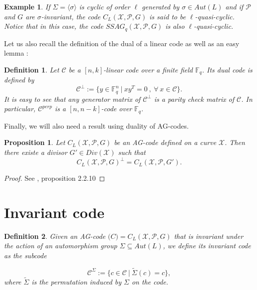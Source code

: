 \documentclass[10pt]{article}
\newtheorem{def1}{Definition}[]
\newtheorem{expl}{Example}[]
\newtheorem{prop1}{Proposition}[]
\newcommand{\s}{\vspace{0.3cm}}
\newcommand{\fq}{\mathbb{F}_q}
\newcommand{\su}{\subseteq}
\newcommand{\X}{\mathcal{X}}
\newcommand{\PR}{\mathcal{P}}
\begin{document}
\s

\begin{expl} 
\rm If $\Sigma = \langle\sigma\rangle$ is cyclic of order $\ell$ generated by $\sigma \in Aut(L)$ and if $\PR$ and $G$ are $\sigma$-invariant, the code $C_L(\X,\PR,G)$ is said to be $\ell$-quasi-cyclic. Notice that in this case, the code $SSAG_q(\X,\PR,G)$ is also $\ell$-quasi-cyclic.
\end{expl}

\s

Let us also recall the definition of the dual of a linear code as well as an easy lemma :

\s

\begin{def1}
Let $\mathcal{C}$ be a $[n,k]$-linear code over a finite field $\fq$. Its dual code is defined by 
\[\mathcal{C}^{\perp} := \{ y \in \fq^n \ | \ xy^T = 0 \ , \ \forall \ x \in \mathcal{C}\}.\]
It is easy to see that any generator matrix of $\mathcal{C}^{\perp}$ is a parity check matrix of $\mathcal{C}$. In particular, $\mathcal{C}^{perp}$ is a $[n,n-k]$-code over $\fq$.
\end{def1}

\s

Finally, we will also need a result using duality of AG-codes.

\s

\begin{prop1}
Let $C_L(\X,\PR,G)$ be an AG-code defined on a curve $\X$. Then there existe a divisor $G' \in Div(\X)$ such that 
\[C_L(\X,\PR,G)^{\perp} = C_L(\X,\PR,G').\]
\end{prop1}

\s

\begin{proof}
See \cite{Sti}, proposition 2.2.10
\end{proof}

\section{Invariant code}

\s

\begin{def1} Given an AG-code $\mathcal(C) = C_L(\X,\PR,G)$ that is invariant under the action of an automorphism group $\Sigma \su Aut(L)$, we define its invariant code as the subcode 

\[\mathcal{C}^{\Sigma} := \{c \in \mathcal{C} \ | \ \tilde{\Sigma}(c)=c\},\]
where $\tilde{\Sigma}$ is the permutation induced by $\Sigma$ on the code.
\end{def1}
\s
\end{document}
